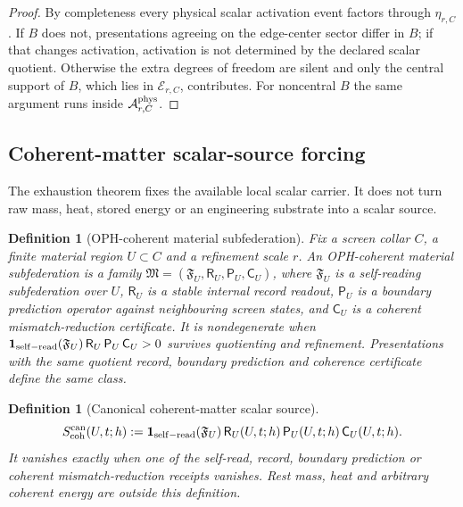 \documentclass[11pt]{article}
\newtheorem{definition}[theorem]{Definition}
\theoremstyle{remark}
\theoremstyle{plain}
\begin{document}
\begin{proof}
By completeness every physical scalar activation event factors through
\(\eta_{r,C}\). If \(B\) does not, presentations agreeing on the edge-center
sector differ in \(B\); if that changes activation, activation is not
determined by the declared scalar quotient. Otherwise the extra degrees of
freedom are silent and only the central support of \(B\), which lies in
\(\mathcal E_{r,C}\), contributes. For noncentral \(B\) the same argument runs
inside \(\mathcal A^{\rm phys}_{r,C}\).
\end{proof}

\subsection{Coherent-matter scalar-source forcing}
\label{sec:coherent-matter-scalar-source-forcing}

The exhaustion theorem fixes the available local scalar carrier. It does not
turn raw mass, heat, stored energy or an engineering substrate into a scalar
source.

\begin{definition}[OPH-coherent material subfederation]
\label{def:oph-coherent-material-subfederation}
Fix a screen collar \(C\), a finite material region \(U\subset C\) and a
refinement scale \(r\). An OPH-coherent material subfederation is a family
\(\mathfrak M=(\mathfrak F_U,\mathsf R_U,\mathsf P_U,\mathsf C_U)\), where
\(\mathfrak F_U\) is a self-reading subfederation over \(U\), \(\mathsf R_U\)
is a stable internal record readout, \(\mathsf P_U\) is a boundary prediction
operator against neighbouring screen states, and \(\mathsf C_U\) is a
coherent mismatch-reduction certificate. It is nondegenerate when
\(\mathbf 1_{\rm self-read}(\mathfrak F_U)\,\mathsf R_U\,\mathsf P_U\,\mathsf C_U>0\)
survives quotienting and refinement. Presentations with the same quotient
record, boundary prediction and coherence certificate define the same class.
\end{definition}

\begin{definition}[Canonical coherent-matter scalar source]
\label{def:canonical-coherent-matter-scalar-source}
\[
S_{\mathrm{coh}}^{\mathrm{can}}(U,t;h):=\mathbf 1_{\rm self-read}(\mathfrak F_U)\,
\mathsf R_U(U,t;h)\,\mathsf P_U(U,t;h)\,\mathsf C_U(U,t;h).
\]
It vanishes
exactly when one of the self-read, record, boundary prediction or coherent
mismatch-reduction receipts vanishes. Rest mass, heat and arbitrary coherent
energy are outside this definition.
\end{definition}
\end{document}
